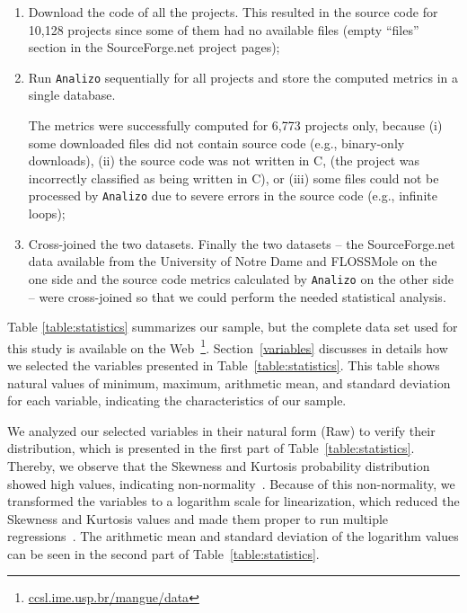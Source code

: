 \documentclass[conference]{IEEEtran}
\begin{document}
\begin{enumerate}
\item Download the code of all the projects. This resulted in the source code 
for 10,128 projects since some of them had no available files (empty ``files''
section in the SourceForge.net project pages);

\item Run \texttt{Analizo} sequentially for all projects and store the computed metrics in a single database.
%

The metrics were successfully computed for 6,773 projects only, because
(i) some downloaded files did not contain source code (e.g., binary-only downloads),
%
(ii) the source code was not written in C, (the project was incorrectly 
classified as being written in C), or
(iii) some files could not be processed by \texttt{Analizo} due to severe
errors in the source code (e.g., infinite loops);

\item Cross-joined the two datasets. Finally the two datasets --
the SourceForge.net data available from the University of Notre Dame and 
FLOSSMole on the one side and the source code metrics calculated 
by \texttt{Analizo} on the other side --  were cross-joined so that
we could perform the needed statistical analysis. 
\end{enumerate}

Table \ref{table:statistics} summarizes our sample, but the complete data set
used for this study is available on the Web~\footnote{\url{ccsl.ime.usp.br/mangue/data}}.
%
Section~\ref{variables} discusses in details how we selected the variables
presented in Table~\ref{table:statistics}.
%
This table shows natural values of minimum, maximum, arithmetic mean, and 
standard deviation for each variable, indicating the characteristics of our sample.

We analyzed our selected variables in their natural form (Raw) to verify their
distribution, which is presented in the first part of Table~\ref{table:statistics}.
%
Thereby, we observe that the Skewness and Kurtosis probability distribution
showed high values, indicating non-normality~\cite{hair2006}.
%
Because of this non-normality, we transformed the variables to a logarithm 
scale for linearization, which reduced the Skewness and Kurtosis values and made
them proper to run multiple regressions~\cite{Crowston2002}.
%
The arithmetic mean and standard deviation of the logarithm values can be
seen in the second part of Table~\ref{table:statistics}.
\end{document}
